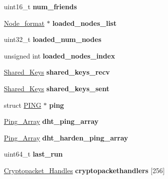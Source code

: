 \begin{DoxyCompactItemize}
\item 
\hypertarget{struct_d_h_t_a8ee1f2d7e543bce350c591a8eaac0cf8}{uint16\+\_\+t {\bfseries num\+\_\+friends}}\label{struct_d_h_t_a8ee1f2d7e543bce350c591a8eaac0cf8}

\item 
\hypertarget{struct_d_h_t_a3050c21873637c51d8001c807f62fa74}{\hyperlink{struct_node__format}{Node\+\_\+format} $\ast$ {\bfseries loaded\+\_\+nodes\+\_\+list}}\label{struct_d_h_t_a3050c21873637c51d8001c807f62fa74}

\item 
\hypertarget{struct_d_h_t_aef4ce67d5df5f093247c73b3a024b73e}{uint32\+\_\+t {\bfseries loaded\+\_\+num\+\_\+nodes}}\label{struct_d_h_t_aef4ce67d5df5f093247c73b3a024b73e}

\item 
\hypertarget{struct_d_h_t_a6525da58097b462adbe2ad9000a6d77d}{unsigned int {\bfseries loaded\+\_\+nodes\+\_\+index}}\label{struct_d_h_t_a6525da58097b462adbe2ad9000a6d77d}

\item 
\hypertarget{struct_d_h_t_a4c647e235c4b9d2d6d68d760c7cb1b30}{\hyperlink{struct_shared___keys}{Shared\+\_\+\+Keys} {\bfseries shared\+\_\+keys\+\_\+recv}}\label{struct_d_h_t_a4c647e235c4b9d2d6d68d760c7cb1b30}

\item 
\hypertarget{struct_d_h_t_a07b2f51891b851ec0cd7dfe729412f77}{\hyperlink{struct_shared___keys}{Shared\+\_\+\+Keys} {\bfseries shared\+\_\+keys\+\_\+sent}}\label{struct_d_h_t_a07b2f51891b851ec0cd7dfe729412f77}

\item 
\hypertarget{struct_d_h_t_ae3f68e3d55e46726b05717fc88198321}{struct \hyperlink{struct_p_i_n_g}{P\+I\+N\+G} $\ast$ {\bfseries ping}}\label{struct_d_h_t_ae3f68e3d55e46726b05717fc88198321}

\item 
\hypertarget{struct_d_h_t_a8432234ba71a00ac9c516cb80a70f29d}{\hyperlink{struct_ping___array}{Ping\+\_\+\+Array} {\bfseries dht\+\_\+ping\+\_\+array}}\label{struct_d_h_t_a8432234ba71a00ac9c516cb80a70f29d}

\item 
\hypertarget{struct_d_h_t_a957126e184a8b8001228effc56b9db95}{\hyperlink{struct_ping___array}{Ping\+\_\+\+Array} {\bfseries dht\+\_\+harden\+\_\+ping\+\_\+array}}\label{struct_d_h_t_a957126e184a8b8001228effc56b9db95}

\item 
\hypertarget{struct_d_h_t_a73e8197b772061572cb931a378ade3e4}{uint64\+\_\+t {\bfseries last\+\_\+run}}\label{struct_d_h_t_a73e8197b772061572cb931a378ade3e4}

\item 
\hypertarget{struct_d_h_t_a461ccd9a581712b103785034f31d0d82}{\hyperlink{struct_cryptopacket___handles}{Cryptopacket\+\_\+\+Handles} {\bfseries cryptopackethandlers} \mbox{[}256\mbox{]}}\label{struct_d_h_t_a461ccd9a581712b103785034f31d0d82}

\end{DoxyCompactItemize}


